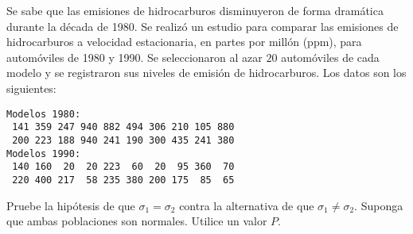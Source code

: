 \begin{enunciado}
 Se sabe que las emisiones de hidrocarburos disminuyeron
 de forma dram\'atica durante la d\'ecada de 1980.
 Se realiz\'o un estudio para comparar las emisiones de hidrocarburos
 a velocidad estacionaria, en partes por mill\'on (ppm),
 para autom\'oviles de 1980 y 1990.
 Se seleccionaron al azar $20$ autom\'oviles de cada modelo y se registraron
 sus niveles de emisi\'on de hidrocarburos.
 Los datos son los siguientes:
 \begin{verbatim}
Modelos 1980:
 141 359 247 940 882 494 306 210 105 880
 200 223 188 940 241 190 300 435 241 380
Modelos 1990:
 140 160  20  20 223  60  20  95 360  70
 220 400 217  58 235 380 200 175  85  65
 \end{verbatim}
 \vspace{-0.5cm}
 Pruebe la hip\'otesis de que $\sigma_1 = \sigma_2$ contra la alternativa
 de que $\sigma_1 \neq \sigma_2$.
 Suponga que ambas poblaciones son normales. Utilice un valor $P$.
\end{enunciado}


